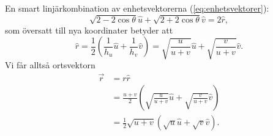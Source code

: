 \documentclass[%
oneside,                 %
final,                   %
10pt]{article}
\newenvironment{doconceexercise}{}{}
\begin{document}
\begin{doconceexercise}
En smart linjärkombination av enhetsvektorerna (\ref{eq:enhetsvektorer}):
\begin{equation}
    \sqrt{2-2\cos\theta}\hat u+\sqrt{2+2\cos\theta}\hat v=2\hat r,
\end{equation}
som översatt till nya koordinater betyder att
\begin{equation}
    \hat r=\frac12\left(\frac1{h_u}\hat u+\frac1{h_v}\hat v\right)=\sqrt{\frac u{u+v}}\hat u+\sqrt{\frac v{u+v}}\hat v.
\end{equation}
Vi får alltså ortsvektorn
\begin{align}
    \vec r&=r\hat r\nonumber\\
    &=\frac{u+v}2\left(\sqrt{\frac u{u+v}}\hat u+\sqrt{\frac v{u+v}}\hat v\right)\nonumber\\
    &=\tfrac12\sqrt{u+v} \left( \sqrt u\hat u + \sqrt v\hat v \right).
\end{align}


\end{doconceexercise}



\end{document}
